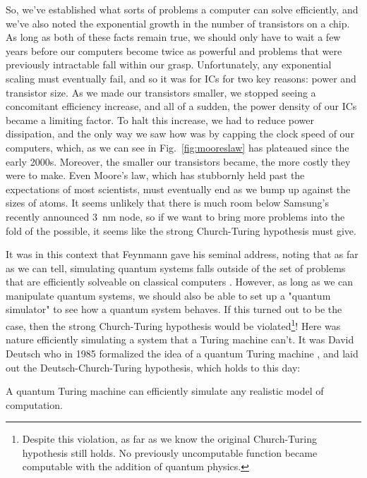 So, we've established what sorts of problems a computer can solve efficiently, and we've also noted the
exponential growth in the number of transistors on a chip. As long as both of these facts remain true, we
should only have to wait a few years before our computers become twice as powerful and problems that were
previously intractable fall within our grasp. Unfortunately, any exponential scaling must eventually fail,
and so it was for ICs for two key reasons: power and transistor size. As we made our transistors smaller,
we stopped seeing a concomitant efficiency increase, and all of a sudden, the power density of our ICs
became a limiting factor. To halt this increase, we had to reduce power dissipation, and the
only way we saw how was by capping the clock speed of our computers, which, as we can see in Fig.~\ref{fig:mooreslaw}
has plateaued since the early 2000s. Moreover, the smaller our transistors became, the more costly they were
to make. Even Moore's law, which has stubbornly held past the expectations of most scientists, must eventually
end as we bump up against the sizes of atoms. It seems unlikely that there is much room below Samsung's
recently announced \SI{3}{\nano\meter} node, so if we want to bring more problems into the fold of the
possible, it seems like the strong Church-Turing hypothesis must give.

It was in this context that Feynmann gave his seminal address, noting that as far as we can tell, simulating
quantum systems falls outside of the set of problems that are efficiently solveable on classical computers \cite{Feynman1982}.
However, as long as we can manipulate quantum systems, we should also be able to set up a "quantum
simulator" to see how a quantum system behaves. If this turned out to be the case, then the strong
Church-Turing hypothesis would be violated\footnote{Despite this violation, as far as we know the original
Church-Turing hypothesis still holds. No previously uncomputable function became computable with the addition
of quantum physics.}! Here was nature efficiently simulating a system that a Turing machine
can't. It was David Deutsch who in 1985 formalized the idea of a quantum Turing machine \cite{doi:10.1098/rspa.1985.0070},
and laid out the Deutsch-Church-Turing hypothesis, which holds to this day:

\begin{displayquote}
  A quantum Turing machine can efficiently simulate any realistic model of computation.
\end{displayquote}

